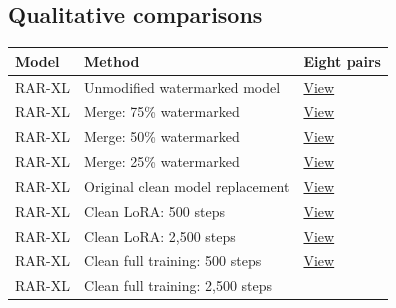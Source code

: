 \subsection{Qualitative
comparisons}\label{record-docs-watermarking-images-md-qualitative-comparisons}

{\scriptsize\setlength{\tabcolsep}{3pt} %
\begin{longtable}[]{@{}
  >{\raggedright\arraybackslash}p{}
  >{\raggedright\arraybackslash}p{}
  >{\raggedright\arraybackslash}p{}@{}}
\toprule\noalign{}
\begin{minipage}[b]{\linewidth}\raggedright
Model
\end{minipage} & \begin{minipage}[b]{\linewidth}\raggedright
Method
\end{minipage} & \begin{minipage}[b]{\linewidth}\raggedright
Eight pairs
\end{minipage} \\
\midrule\noalign{}
\endhead
\bottomrule\noalign{}
\endlastfoot
RAR-XL & Unmodified watermarked model &
\href{records/docs/watermarking/qualitative/image-rar-weight-unmodified-supplied.tex}{View} \\
RAR-XL & Merge: 75\% watermarked &
\href{records/docs/watermarking/qualitative/image-rar-weight-merge-0-75.tex}{View} \\
RAR-XL & Merge: 50\% watermarked &
\href{records/docs/watermarking/qualitative/image-rar-weight-merge-0-5.tex}{View} \\
RAR-XL & Merge: 25\% watermarked &
\href{records/docs/watermarking/qualitative/image-rar-weight-merge-0-25.tex}{View} \\
RAR-XL & Original clean model replacement &
\href{records/docs/watermarking/qualitative/image-rar-weight-merge-0.tex}{View} \\
RAR-XL & Clean LoRA: 500 steps &
\href{records/docs/watermarking/qualitative/image-rar-weight-clean-lora-500.tex}{View} \\
RAR-XL & Clean LoRA: 2,500 steps &
\href{records/docs/watermarking/qualitative/image-rar-weight-clean-lora-2500.tex}{View} \\
RAR-XL & Clean full training: 500 steps &
\href{records/docs/watermarking/qualitative/image-rar-weight-clean-full-500.tex}{View} \\
RAR-XL & Clean full training: 2,500 steps &

\end{longtable}}
